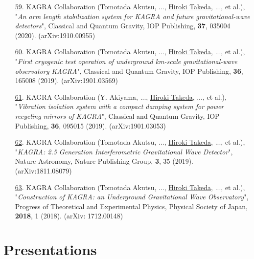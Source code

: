 \documentclass[uplatex, 12pt]{article}
\begin{document}
\begin{enumerate}
\item[\uline{59}.] KAGRA Collaboration (Tomotada Akutsu, ..., \uline{Hiroki Takeda}, ..., et al.), "\emph{An arm length stabilization system for KAGRA and future gravitational-wave detectors}", Classical and Quantum Gravity, IOP Publishing, {\bf 37}, 035004 (2020). (arXiv:1910.00955)\\

\item[\uline{60}.] KAGRA Collaboration (Tomotada Akutsu, ..., \uline{Hiroki Takeda}, ..., et al.), "\emph{First cryogenic test operation of underground km-scale gravitational-wave observatory KAGRA}", Classical and Quantum Gravity, IOP Publishing, {\bf 36}, 165008 (2019). (arXiv:1901.03569)\\

\item[\uline{61}.] KAGRA Collaboration (Y. Akiyama, ..., \uline{Hiroki Takeda}, ..., et al.), "\emph{Vibration isolation system with a compact damping system for power recycling mirrors of KAGRA}", Classical and Quantum Gravity, IOP Publishing, {\bf 36}, 095015 (2019). (arXiv:1901.03053)\\

\item[\uline{62}.] KAGRA Collaboration (Tomotada Akutsu, ..., \uline{Hiroki Takeda}, ..., et al.), "\emph{KAGRA: 2.5 Generation Interferometric Gravitational Wave Detector}", Nature Astronomy, Nature Publishing Group, {\bf 3}, 35 (2019). (arXiv:1811.08079)\\

\item[\uline{63}.] KAGRA Collaboration (Tomotada Akutsu, ..., \uline{Hiroki Takeda}, ..., et al.), "\emph{Construction of KAGRA: an Underground Gravitational Wave Observatory}", Progress of Theoretical and Experimental Physics, Physical Society of Japan, {\bf 2018}, 1 (2018). (arXiv: 1712.00148)

\end{enumerate}


\section*{Presentations}
\end{document}
